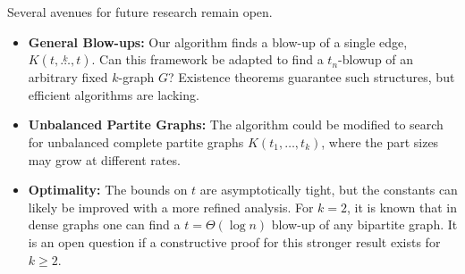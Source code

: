 \documentclass[11pt,a4paper]{article}
\newcommand{\compoverset}[2]{\ensuremath{K(#2, \overset{#1}{\dots}, #2)}}
\newcommand{\compdots}[2]{\ensuremath{K(#1, \dots, #2)}}
\theoremstyle{definition}
\begin{document}
Several avenues for future research remain open.
\begin{itemize}
    \item \textbf{General Blow-ups:} Our algorithm finds a blow-up of a single edge, $\compoverset{k}{t}$. Can this framework be adapted to find a $t_n$-blowup of an arbitrary fixed $k$-graph $G$? Existence theorems guarantee such structures, but efficient algorithms are lacking.
    \item \textbf{Unbalanced Partite Graphs:} The algorithm could be modified to search for unbalanced complete partite graphs $\compdots{t_1}{t_k}$, where the part sizes may grow at different rates.
    \item \textbf{Optimality:} The bounds on $t$ are asymptotically tight, but the constants can likely be improved with a more refined analysis. For $k=2$, it is known that in dense graphs one can find a $t=\Theta(\log n)$ blow-up of any bipartite graph. It is an open question if a constructive proof for this stronger result exists for $k \ge 2$.
\end{itemize}
\end{document}
